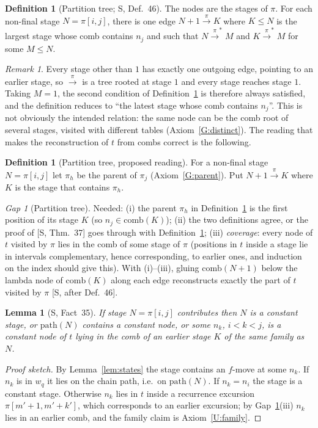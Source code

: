 \documentclass[11pt]{article}
\newcommand{\iv}[2]{\pi[#1,#2]}
\newcommand{\comb}{\mathrm{comb}}
\newcommand{\pth}{\mathrm{path}}
\newcommand{\ra}[1]{\xrightarrow{#1}}
\theoremstyle{plain}
\newtheorem{lemma}[theorem]{Lemma}
\theoremstyle{definition}
\newtheorem{definition}[theorem]{Definition}
\theoremstyle{remark}
\newtheorem{remark}[theorem]{Remark}
\newtheorem{gap}{Gap}
\begin{document}
\begin{definition}[Partition tree; S, Def.~46]\label{def:ptree}
The nodes are the stages of $\pi$.  For each non-final stage $N=\iv ij$,
there is one edge $N+1\ra\pi K$ where $K\le N$ is the largest stage whose
comb contains $n_j$ and such that $N\ra\pi^*M$ and $K\ra\pi^*M$ for some
$M\le N$.
\end{definition}

\begin{remark}\label{rem:ptree}
Every stage other than $1$ has exactly one outgoing edge, pointing to an
earlier stage, so $\ra\pi$ is a tree rooted at stage $1$ and every stage
reaches stage $1$.  Taking $M=1$, the second condition of
Definition~\ref{def:ptree} is therefore always satisfied, and the
definition reduces to ``the latest stage whose comb contains $n_j$''.
This is not obviously the intended relation: the same node can be the
comb root of several stages, visited with different tables
(Axiom~\ref{G:distinct}).  The reading that makes the reconstruction of
$t$ from combs correct is the following.
\end{remark}

\begin{definition}[Partition tree, proposed reading]\label{def:ptree2}
For a non-final stage $N=\iv ij$ let $\pi_h$ be the parent of $\pi_j$
(Axiom~\ref{G:parent}).  Put $N+1\ra\pi K$ where $K$ is the stage that
contains $\pi_h$.
\end{definition}

\begin{gap}[Partition tree]\label{gap:ptree}
Needed: (i) the parent $\pi_h$ in Definition~\ref{def:ptree2} is the
first position of its stage $K$ (so $n_j\in\comb(K)$); (ii) the two
definitions agree, or the proof of [S, Thm.~37] goes through with
Definition~\ref{def:ptree2}; (iii) \emph{coverage}: every node of $t$
visited by $\pi$ lies in the comb of some stage of $\pi$ (positions in
$t$ inside a stage lie in intervals complementary, hence corresponding,
to earlier ones, and induction on the index should give this).  With
(i)--(iii), gluing $\comb(N+1)$ below the lambda node of $\comb(K)$
along each edge reconstructs exactly the part of $t$ visited by $\pi$
[S, after Def.~46].
\end{gap}

\begin{lemma}[S, Fact~35]\label{lem:contrib-kinds}
If stage $N=\iv ij$ contributes then $N$ is a constant stage, or
$\pth(N)$ contains a constant node, or some $n_k$, $i<k<j$, is a
constant node of $t$ lying in the comb of an earlier stage $K$ of the
same family as $N$.
\end{lemma}
\begin{proof}[Proof sketch]
By Lemma~\ref{lem:states} the stage contains an $f$-move at some $n_k$.
If $n_k$ is in $w_q$ it lies on the chain path, i.e.\ on $\pth(N)$.  If
$n_k=n_i$ the stage is a constant stage.  Otherwise $n_k$ lies in $t$
inside a recurrence excursion $\iv{m'+1}{m'+k'}$, which corresponds to an
earlier excursion; by Gap~\ref{gap:ptree}(iii) $n_k$ lies in an earlier
comb, and the family claim is Axiom~\ref{U:family}.
\end{proof}
\end{document}
